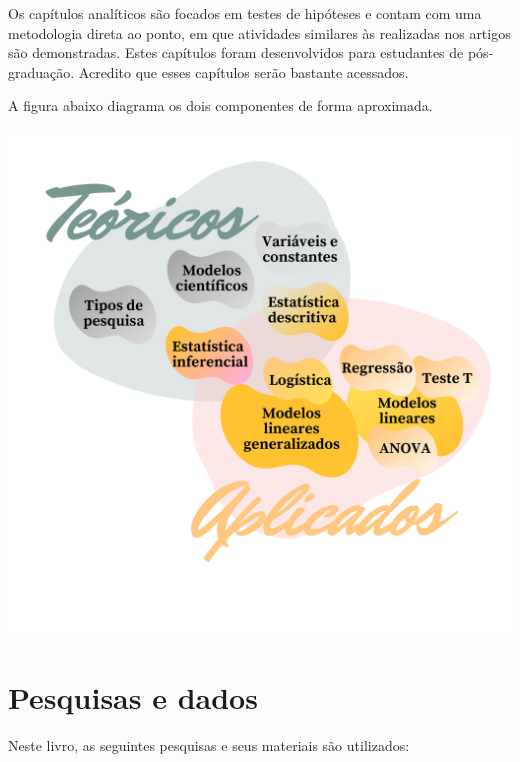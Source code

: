 \documentclass[
]{book}
\begin{document}
Os capítulos analíticos são focados em testes de hipóteses e contam com uma metodologia direta ao ponto, em que atividades similares às realizadas nos artigos são demonstradas. Estes capítulos foram desenvolvidos para estudantes de pós-graduação. Acredito que esses capítulos serão bastante acessados.

A figura abaixo diagrama os dois componentes de forma aproximada.

\includegraphics{./img/proposta.png}

\hypertarget{pesquisas-e-dados}{%
\section{Pesquisas e dados}\label{pesquisas-e-dados}}

Neste livro, as seguintes pesquisas e seus materiais são utilizados:
\end{document}
